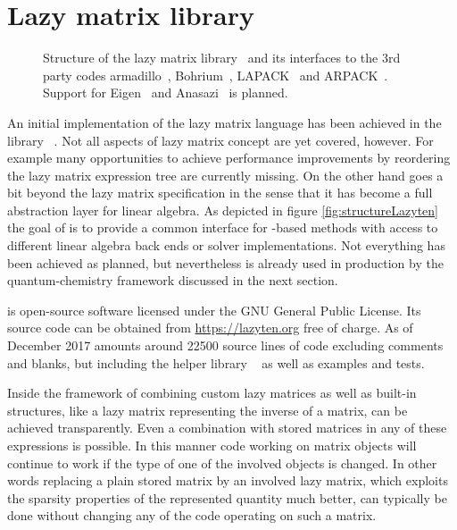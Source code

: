 \section{Lazy matrix library \lazyten}
\label{sec:lazyten}
\begin{figure}
	\centering
	\caption[Structure of the \lazyten lazy matrix library]{%
		Structure of the \lazyten lazy matrix library~\cite{lazytenWeb}
		and its interfaces to the 3rd party codes
		armadillo~\cite{Armadillo}, Bohrium~\cite{Kristensen2016array,Kristensen2016streaming},
		LAPACK~\cite{LAPACK} and ARPACK~\cite{ARPACK}.
		Support for Eigen~\cite{Eigen} and Anasazi~\cite{Anasazi} is planned.
	}
	\label{fig:structureLazyten}
\end{figure}
An initial implementation of the lazy matrix language has been
achieved in the \cpp library \lazyten~\cite{lazytenWeb}.
Not all aspects of lazy matrix concept are yet covered, however.
For example many opportunities to achieve performance improvements
by reordering the lazy matrix expression tree are currently missing.
On the other hand \lazyten goes a bit beyond the lazy matrix specification
in the sense that it has become a full abstraction layer for linear algebra.
As depicted in figure \vref{fig:structureLazyten}
the goal of \lazyten is to provide a common interface
for \contraction-based methods
with access to different linear algebra back ends or solver implementations.
Not everything has been achieved as planned,
but nevertheless \lazyten is already used in production
by the \molsturm quantum-chemistry framework discussed in the next section.

\lazyten is open-source software licensed under the
GNU General Public License.
Its source code can be obtained from \url{https://lazyten.org} free of charge.
As of December 2017 \lazyten amounts around 22500 source lines of code
excluding comments and blanks,
but including the helper library \krims~\cite{krimsWeb}
as well as examples and tests.

Inside the framework of \lazyten combining custom lazy matrices
as well as built-in structures,
like a lazy matrix representing the inverse of a matrix,
can be achieved transparently.
Even a combination with stored matrices in any of these expressions is possible.
In this manner code working on \lazyten matrix objects
will continue to work if the type of one of the involved objects is changed.
In other words replacing a plain stored matrix by an involved lazy matrix,
which exploits the sparsity properties of the represented quantity
much better,
can typically be done without changing any of the code operating on such a matrix.


